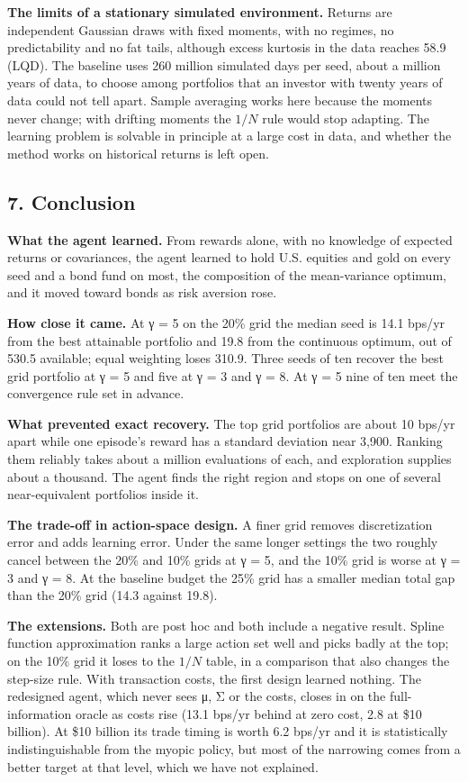 \documentclass[
  11pt]{article}
\begin{document}
\textbf{The limits of a stationary simulated environment.} Returns are
independent Gaussian draws with fixed moments, with no regimes, no
predictability and no fat tails, although excess kurtosis in the data
reaches 58.9 (LQD). The baseline uses 260 million simulated days per
seed, about a million years of data, to choose among portfolios that an
investor with twenty years of data could not tell apart. Sample
averaging works here because the moments never change; with drifting
moments the \(1/N\) rule would stop adapting. The learning problem is
solvable in principle at a large cost in data, and whether the method
works on historical returns is left open.

\subsection{7. Conclusion}\label{conclusion}

\textbf{What the agent learned.} From rewards alone, with no knowledge
of expected returns or covariances, the agent learned to hold U.S.
equities and gold on every seed and a bond fund on most, the composition
of the mean-variance optimum, and it moved toward bonds as risk aversion
rose.

\textbf{How close it came.} At γ = 5 on the 20\% grid the median seed is
14.1 bps/yr from the best attainable portfolio and 19.8 from the
continuous optimum, out of 530.5 available; equal weighting loses 310.9.
Three seeds of ten recover the best grid portfolio at γ = 5 and five at
γ = 3 and γ = 8. At γ = 5 nine of ten meet the convergence rule set in
advance.

\textbf{What prevented exact recovery.} The top grid portfolios are
about 10 bps/yr apart while one episode's reward has a standard
deviation near 3,900. Ranking them reliably takes about a million
evaluations of each, and exploration supplies about a thousand. The
agent finds the right region and stops on one of several near-equivalent
portfolios inside it.

\textbf{The trade-off in action-space design.} A finer grid removes
discretization error and adds learning error. Under the same longer
settings the two roughly cancel between the 20\% and 10\% grids at γ =
5, and the 10\% grid is worse at γ = 3 and γ = 8. At the baseline budget
the 25\% grid has a smaller median total gap than the 20\% grid (14.3
against 19.8).

\textbf{The extensions.} Both are post hoc and both include a negative
result. Spline function approximation ranks a large action set well and
picks badly at the top; on the 10\% grid it loses to the \(1/N\) table,
in a comparison that also changes the step-size rule. With transaction
costs, the first design learned nothing. The redesigned agent, which
never sees μ, Σ or the costs, closes in on the full-information oracle
as costs rise (13.1 bps/yr behind at zero cost, 2.8 at \$10 billion). At
\$10 billion its trade timing is worth 6.2 bps/yr and it is
statistically indistinguishable from the myopic policy, but most of the
narrowing comes from a better target at that level, which we have not
explained.
\end{document}
